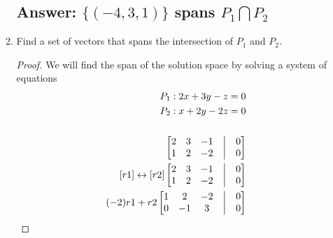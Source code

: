 \documentclass[12pt]{article}
\begin{document}
\begin{enumerate}
\begin{enumerate}
                            \subsection{Answer: $\{(-4, 3, 1)\}$ spans $P_1 \bigcap P_2$}
                      \item Find a set of vectors that spans the intersection of $P_1$ and $P_2$.
                            \begin{proof}
                                    We will find the span of the solution space by solving a system of equations
                                    \begin{align*}
                                            P_{1}: 2x+3y-z = 0         \\
                                            P_{2}: x+2y-2z = 0         \\\\
                                            \begin{bmatrix}
                                                    2 & 3 & -1 & \bigm| & 0 \\
                                                    1 & 2 & -2 & \bigm| & 0 \\
                                            \end{bmatrix}
                                            \\
                                            [r1] \leftrightarrow  [r2]
                                            \begin{bmatrix}
                                                    2 & 3 & -1 & \bigm| & 0 \\
                                                    1 & 2 & -2 & \bigm| & 0 \\
                                            \end{bmatrix}
                                            \\
                                            (-2)r1+r2
                                            \begin{bmatrix}
                                                    1 & 2  & -2 & \bigm| & 0 \\
                                                    0 & -1 & 3  & \bigm| & 0 \\
                                            \end{bmatrix}
                                            \\

\end{align*}
\end{proof}
\end{enumerate}
\end{enumerate}
\end{document}
